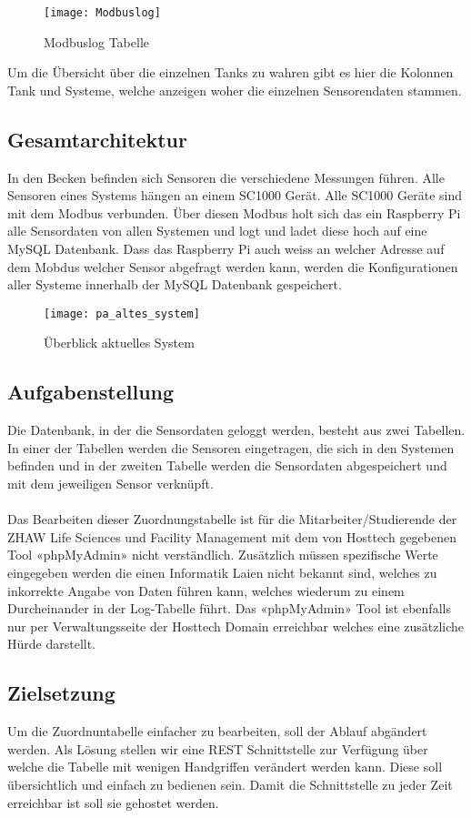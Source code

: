 \documentclass[../main.tex]{subfiles}
\begin{document}
	\begin{figure}[H]
		\centering
		\texttt{[image: Modbuslog]}
		\caption{Modbuslog Tabelle}
		\label{fig:Modbuslog}
	\end{figure}
	\par \noindent	
	Um die Übersicht über die einzelnen Tanks zu wahren gibt es hier die Kolonnen Tank und Systeme, welche anzeigen woher die einzelnen Sensorendaten stammen.
	
	\subsection{Gesamtarchitektur}
	In den Becken befinden sich Sensoren die verschiedene Messungen führen. Alle Sensoren eines Systems hängen an einem SC1000 Gerät. Alle SC1000 Geräte sind mit dem Modbus verbunden. Über diesen Modbus holt sich das ein Raspberry Pi alle Sensordaten von allen Systemen und logt und ladet diese hoch auf eine MySQL Datenbank. Dass das Raspberry Pi auch weiss an welcher Adresse auf dem Mobdus welcher Sensor abgefragt werden kann, werden die Konfigurationen aller Systeme innerhalb der MySQL Datenbank gespeichert.
	\begin{figure}[H]
		\centering
		\texttt{[image: pa\_altes\_system]}
		\caption{Überblick aktuelles System}
		\label{fig:pa_altes_system}
	\end{figure}
	
	\subsection{Aufgabenstellung}
	Die Datenbank, in der die Sensordaten geloggt werden, besteht aus zwei Tabellen. In einer der Tabellen werden die Sensoren eingetragen, die sich in den Systemen befinden und in der zweiten Tabelle werden die Sensordaten abgespeichert und mit dem jeweiligen Sensor verknüpft. \\
	\\	
	Das Bearbeiten dieser Zuordnungstabelle ist für die Mitarbeiter/Studierende der ZHAW Life Sciences und Facility Management mit dem von Hosttech gegebenen Tool «phpMyAdmin» nicht verständlich. Zusätzlich müssen spezifische Werte eingegeben werden die einen Informatik Laien nicht bekannt sind, welches zu inkorrekte Angabe von Daten führen kann, welches wiederum zu einem Durcheinander in der Log-Tabelle führt. 
	Das «phpMyAdmin» Tool ist ebenfalls nur per Verwaltungsseite der Hosttech Domain erreichbar welches eine zusätzliche Hürde darstellt.
	
	\subsection{Zielsetzung}
	Um die Zuordnuntabelle einfacher zu bearbeiten, soll der Ablauf abgändert werden. Als Lösung stellen wir eine REST Schnittstelle zur Verfügung über welche die Tabelle mit wenigen Handgriffen verändert werden kann. 
	Diese soll übersichtlich und einfach zu bedienen sein. Damit die Schnittstelle zu jeder Zeit erreichbar ist soll sie gehostet werden.
\end{document}
